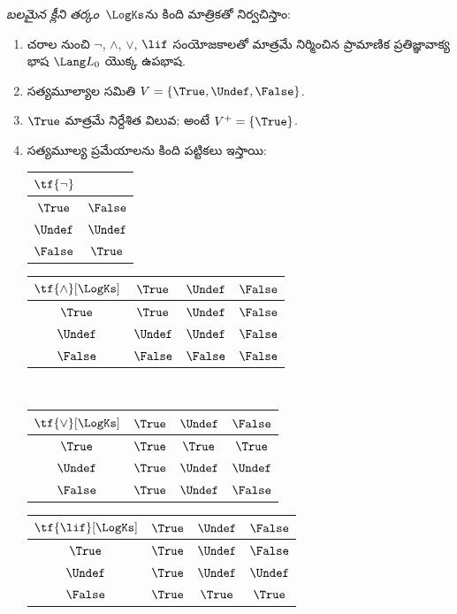 \documentclass[../../../include/open-logic-section]{subfiles}
\begin{document}
\begin{defn}
\emph{బలమైన క్లీని తర్కం}~$\LogKs$ను కింది మాత్రికతో
నిర్వచిస్తాం:
\begin{enumerate}
  \item చరాల నుంచి $\lnot$, $\land$, $\lor$, $\lif$
  సంయోజకాలతో మాత్రమే నిర్మించిన ప్రామాణిక
  ప్రతిజ్ఞావాక్య భాష $\Lang L_0$ యొక్క ఉపభాష.
  \item సత్యమూల్యాల సమితి $V = \{\True, \Undef, \False\}$.
  \item $\True$ మాత్రమే నిర్దేశిత విలువ; అంటే
  $V^+ = \{\True\}$.
  \item సత్యమూల్య ప్రమేయాలను కింది పట్టికలు ఇస్తాయి:
  \begin{center}
    \begin{tabular}{c|c}
      $\tf{\lnot}$ & \\
      \hline
      $\True$ & $\False$ \\
      $\Undef$ & $\Undef$ \\
      $\False$ & $\True$
    \end{tabular}
    \quad
    \begin{tabular}{c|ccc}
      $\tf{\land}[\LogKs]$ & $\True$ & $\Undef$ & $\False$ \\
      \hline
      $\True$ & $\True$ & $\Undef$ & $\False$ \\
      $\Undef$ & $\Undef$ & $\Undef$ & $\False$\\
      $\False$ & $\False$ & $\False$ & $\False$
    \end{tabular}
    \\[2ex]
    \begin{tabular}{c|ccc}
      $\tf{\lor}[\LogKs]$ & $\True$ & $\Undef$ & $\False$ \\
      \hline
      $\True$ & $\True$ & $\True$ & $\True$ \\
      $\Undef$ & $\True$ & $\Undef$ & $\Undef$ \\
      $\False$ & $\True$ & $\Undef$ & $\False$
    \end{tabular}
    \quad
    \begin{tabular}{c|ccc}
      $\tf{\lif}[\LogKs]$ & $\True$ & $\Undef$ & $\False$ \\
      \hline
      $\True$ & $\True$ & $\Undef$ & $\False$ \\
      $\Undef$ & $\True$ & $\Undef$ & $\Undef$  \\
      $\False$ & $\True$ & $\True$ & $\True$
    \end{tabular}
  \end{center}
\end{enumerate}
\end{defn}
\end{document}

